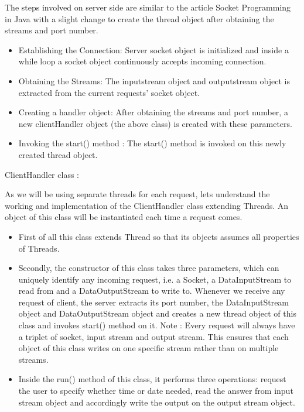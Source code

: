 \documentclass[11pt]{article}
\begin{document}
The steps involved on server side are similar to the article Socket Programming in Java with a slight change to create the thread object after obtaining the streams and port number.
\begin{itemize}
        \item Establishing the Connection: Server socket object is initialized and inside a while loop a socket object continuously accepts incoming connection.
        \item Obtaining the Streams: The inputstream object and outputstream object is extracted from the current requests’ socket object.
        \item Creating a handler object: After obtaining the streams and port number, a new clientHandler object (the above class) is created with these parameters.
        \item Invoking the start() method : The start() method is invoked on this newly created thread object.
\end{itemize}
\pagebreak
\vspace{.5cm}
ClientHandler class : 
\vspace{.5cm}

 As we will be using separate threads for each request, lets understand the working and implementation of the ClientHandler class extending Threads. An object of this class will be instantiated each time a request comes.
 \begin{itemize}
        \item First of all this class extends Thread so that its objects assumes all properties of Threads.
        \item Secondly, the constructor of this class takes three parameters, which can uniquely identify any incoming request, i.e. a Socket, a DataInputStream to read from and a DataOutputStream to write to. Whenever we receive any request of client, the server extracts its port number, the DataInputStream object and DataOutputStream object and creates a new thread object of this class and invokes start() method on it.
        Note : Every request will always have a triplet of socket, input stream and output stream. This ensures that each object of this class writes on one specific stream rather than on multiple streams.
        \item Inside the run() method of this class, it performs three operations: request the user to specify whether time or date needed, read the answer from input stream object and accordingly write the output on the output stream object.

\end{itemize}
\end{document}
